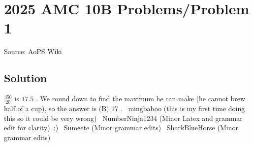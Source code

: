 \documentclass[12pt]{article}
\begin{document}
\section*{{2025 AMC 10B Problems/Problem 1}}
Source: AoPS Wiki

\subsection*{Solution}
$\frac{350}{20}$ is $17.5$ . We round down to find the maximum he can make (he cannot brew half of a cup), so the answer is $\boxed{\text{(B) }17}$ . ~mingbaboo (this is my first time doing this so it could be very wrong) ~NumberNinja1234 (Minor Latex and grammar edit for clarity) :) ~Sumeete (Minor grammar edits) ~SharkBlueHorse (Minor grammar edits)
\end{document}
